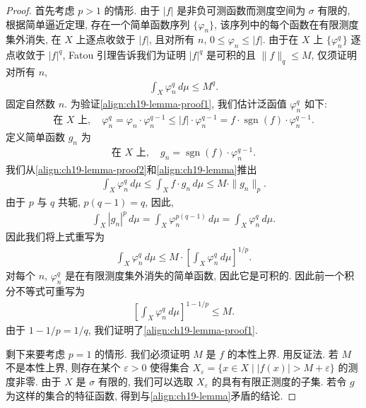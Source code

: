 \documentclass[../../main.tex]{subfiles}
\begin{document}
\begin{proof}
首先考虑 $p>1$ 的情形. 由于 $|f|$ 是非负可测函数而测度空间为 $\sigma$ 有限的, 根据简单逼近定理, 存在一个简单函数序列 $\{\varphi_{n}\}$, 该序列中的每个函数在有限测度集外消失, 在 $X$ 上逐点收敛于 $|f|$, 且对所有 $n$, $0\leqslant\varphi_{n}\leqslant|f|$. 由于在 $X$ 上 $\{\varphi_{n}^{q}\}$ 逐点收敛于 $|f|^{q}$, Fatou 引理告诉我们为证明 $|f|^{q}$ 是可积的且 $\|f\|_{q}\leqslant M$, 仅须证明对所有 $n$,
\begin{align}
\int_{X}\varphi_{n}^{q}\,d\mu\leqslant M^{q}.\label{align:ch19-lemma-proof1}
\end{align}
固定自然数 $n$. 为验证\eqref{align:ch19-lemma-proof1}, 我们估计泛函值 $\varphi_{n}^{q}$ 如下:
\begin{align}
\text{在 }X\text{ 上},\quad\varphi_{n}^{q}=\varphi_{n}\cdot\varphi_{n}^{q-1}\leqslant|f|\cdot\varphi_{n}^{q-1}=f\cdot\operatorname{sgn}(f)\cdot\varphi_{n}^{q-1}.\label{align:ch19-lemma-proof2}
\end{align}
定义简单函数 $g_{n}$ 为
\begin{align*}
\text{在 }X\text{ 上},\quad g_{n}=\operatorname{sgn}(f)\cdot\varphi_{n}^{q-1}.
\end{align*}
我们从\eqref{align:ch19-lemma-proof2}和\eqref{align:ch19-lemma}推出
\begin{align*}
\int_{X}\varphi_{n}^{q}\,d\mu\leqslant\int_{X}f\cdot g_{n}\,d\mu\leqslant M\cdot\|g_{n}\|_{p}.
\end{align*}
由于 $p$ 与 $q$ 共轭, $p(q-1)=q$, 因此,
\begin{align*}
\int_{X}|g_{n}|^{p}\,d\mu=\int_{X}\varphi_{n}^{p(q-1)}\,d\mu=\int_{X}\varphi_{n}^{q}\,d\mu.
\end{align*}
因此我们将上式重写为
\begin{align*}
\int_{X}\varphi_{n}^{q}\,d\mu\leqslant M\cdot\left[\int_{X}\varphi_{n}^{q}\,d\mu\right]^{1/p}.
\end{align*}
对每个 $n$, $\varphi_{n}^{q}$ 是在有限测度集外消失的简单函数, 因此它是可积的. 因此前一个积分不等式可重写为
\begin{align*}
\left[\int_{X}\varphi_{n}^{q}\,d\mu\right]^{1-1/p}\leqslant M.
\end{align*}
由于 $1-1/p=1/q$, 我们证明了\eqref{align:ch19-lemma-proof1}.

剩下来要考虑 $p=1$ 的情形. 我们必须证明 $M$ 是 $f$ 的本性上界. 用反证法. 若 $M$ 不是本性上界, 则存在某个 $\varepsilon>0$ 使得集合 $X_{\varepsilon}=\{x\in X\mid|f(x)|>M+\varepsilon\}$ 的测度非零. 由于 $X$ 是 $\sigma$ 有限的, 我们可以选取 $X_{\varepsilon}$ 的具有有限正测度的子集. 若令 $g$ 为这样的集合的特征函数, 得到与\eqref{align:ch19-lemma}矛盾的结论.
\end{proof}
\end{document}
